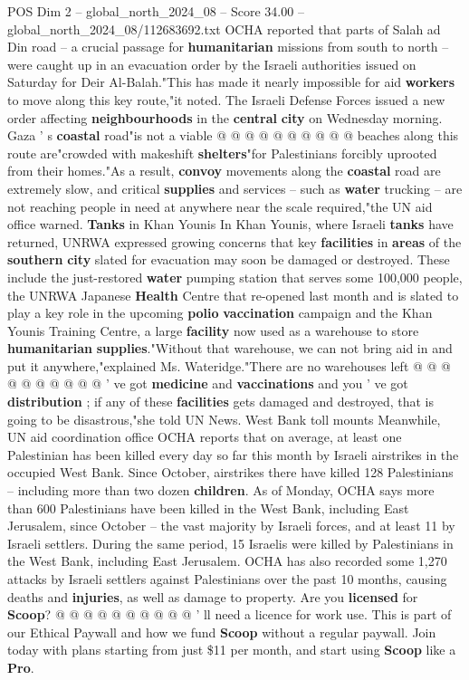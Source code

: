 \begin{textsample}{POS Dim 2 – global\_north\_2024\_08 – Score 34.00 – global\_north\_2024\_08/112683692.txt}
OCHA reported that parts of Salah ad Din road -- a crucial passage for \textbf{humanitarian} missions from south to north -- were caught up in an evacuation order by the Israeli authorities issued on Saturday for Deir Al-Balah."This has made it nearly impossible for aid \textbf{workers} to move along this key route,"it noted.
The Israeli Defense Forces issued a new order affecting \textbf{neighbourhoods} in the \textbf{central} \textbf{city} on Wednesday morning.
Gaza ' s \textbf{coastal} road"is not a viable @ @ @ @ @ @ @ @ @ @ beaches along this route are"crowded with makeshift \textbf{shelters}"for Palestinians forcibly uprooted from their homes."As a result, \textbf{convoy} movements along the \textbf{coastal} road are extremely slow, and critical \textbf{supplies} and services -- such as \textbf{water} trucking -- are not reaching people in need at anywhere near the scale required,"the UN aid office warned. \textbf{Tanks} in Khan Younis In Khan Younis, where Israeli \textbf{tanks} have returned, UNRWA expressed growing concerns that key \textbf{facilities} in \textbf{areas} of the \textbf{southern} \textbf{city} slated for evacuation may soon be damaged or destroyed.
These include the just-restored \textbf{water} pumping station that serves some 100,000 people, the UNRWA Japanese \textbf{Health} Centre that re-opened last month and is slated to play a key role in the upcoming \textbf{polio} \textbf{vaccination} campaign and the Khan Younis Training Centre, a large \textbf{facility} now used as a warehouse to store \textbf{humanitarian} \textbf{supplies}."Without that warehouse, we can not bring aid in and put it anywhere,"explained Ms.
Wateridge."There are no warehouses left @ @ @ @ @ @ @ @ @ @ ' ve got \textbf{medicine} and \textbf{vaccinations} and you ' ve got \textbf{distribution} ; if any of these \textbf{facilities} gets damaged and destroyed, that is going to be disastrous,"she told UN News.
West Bank toll mounts Meanwhile, UN aid coordination office OCHA reports that on average, at least one Palestinian has been killed every day so far this month by Israeli airstrikes in the occupied West Bank.
Since October, airstrikes there have killed 128 Palestinians -- including more than two dozen \textbf{children}.
As of Monday, OCHA says more than 600 Palestinians have been killed in the West Bank, including East Jerusalem, since October -- the vast majority by Israeli forces, and at least 11 by Israeli settlers.
During the same period, 15 Israelis were killed by Palestinians in the West Bank, including East Jerusalem.
OCHA has also recorded some 1,270 attacks by Israeli settlers against Palestinians over the past 10 months, causing deaths and \textbf{injuries}, as well as damage to property.
Are you \textbf{licensed} for \textbf{Scoop}? @ @ @ @ @ @ @ @ @ @ ' ll need a licence for work use.
This is part of our Ethical Paywall and how we fund \textbf{Scoop} without a regular paywall.
Join today with plans starting from just \$11 per month, and start using \textbf{Scoop} like a \textbf{Pro}.


\end{textsample}
